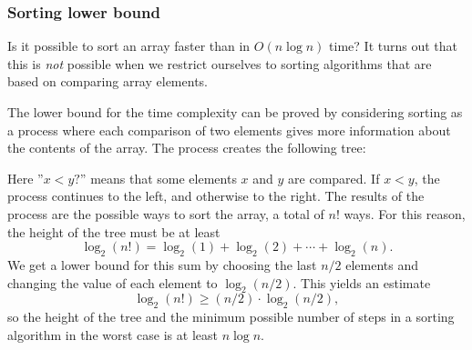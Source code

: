 \subsubsection{Sorting lower bound}

Is it possible to sort an array faster
than in $O(n \log n)$ time?
It turns out that this is \emph{not} possible
when we restrict ourselves to sorting algorithms
that are based on comparing array elements.

The lower bound for the time complexity
can be proved by considering sorting
as a process where each comparison of two elements
gives more information about the contents of the array.
The process creates the following tree:

\begin{center}
\end{center}

Here ''$x<y?$'' means that some elements
$x$ and $y$ are compared.
If $x<y$, the process continues to the left,
and otherwise to the right.
The results of the process are the possible
ways to sort the array, a total of $n!$ ways.
For this reason, the height of the tree
must be at least
\[ \log_2(n!) = \log_2(1)+\log_2(2)+\cdots+\log_2(n).\]
We get a lower bound for this sum
by choosing the last $n/2$ elements and
changing the value of each element to $\log_2(n/2)$.
This yields an estimate
\[ \log_2(n!) \ge (n/2) \cdot \log_2(n/2),\]
so the height of the tree and the minimum
possible number of steps in a sorting
algorithm in the worst case
is at least $n \log n$.

